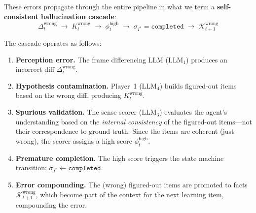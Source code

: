 \documentclass[11pt,letterpaper]{article}
\begin{document}
These errors propagate through the entire pipeline in what we term a \textbf{self-consistent hallucination cascade}:
\begin{equation}
  \Delta_t^{\text{wrong}} \;\rightarrow\; K_t^{\text{wrong}} \;\rightarrow\; \phi_t^{\text{high}} \;\rightarrow\; \sigma_{I^*} = \texttt{completed} \;\rightarrow\; \mathcal{K}_{t+1}^{\text{wrong}}
  \label{eq:cascade}
\end{equation}

The cascade operates as follows:
\begin{enumerate}[leftmargin=2em]
  \item \textbf{Perception error.} The frame differencing LLM ($\text{LLM}_1$) produces an incorrect diff $\Delta_t^{\text{wrong}}$.
  \item \textbf{Hypothesis contamination.} Player~1 ($\text{LLM}_4$) builds figured-out items based on the wrong diff, producing $K_t^{\text{wrong}}$.
  \item \textbf{Spurious validation.} The sense scorer ($\text{LLM}_3$) evaluates the agent's understanding based on the \emph{internal consistency} of the figured-out items---not their correspondence to ground truth. Since the items are coherent (just wrong), the scorer assigns a high score $\phi_t^{\text{high}}$.
  \item \textbf{Premature completion.} The high score triggers the state machine transition: $\sigma_{I^*} \leftarrow \texttt{completed}$.
  \item \textbf{Error compounding.} The (wrong) figured-out items are promoted to facts $\mathcal{K}_{t+1}^{\text{wrong}}$, which become part of the context for the next learning item, compounding the error.
\end{enumerate}
\end{document}
